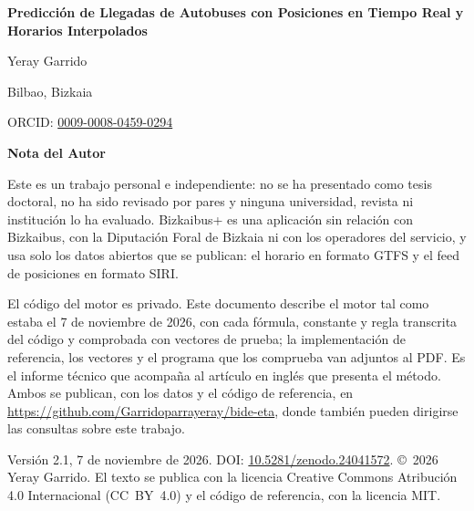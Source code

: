 \documentclass[12pt,letterpaper,oneside,openany]{book}
\theoremstyle{definition}
\renewcommand{\_}{\guionbajo\penalty50\hspace{0pt}}
\begin{document}

\thispagestyle{apa}
\begingroup
  \centering
  \vspace*{3\baselineskip}
  {\bfseries Predicción de Llegadas de Autobuses con Posiciones en Tiempo Real y Horarios Interpolados\par}
  \vspace{\baselineskip}
  Yeray Garrido\par
  Bilbao, Bizkaia\par
  ORCID: \href{https://orcid.org/0009-0008-0459-0294}{0009-0008-0459-0294}\par
  \vfill
  {\bfseries Nota del Autor\par}
  \RaggedRight
  \setlength{\parindent}{1.27cm}
  Este es un trabajo personal e independiente: no se ha presentado como tesis doctoral, no ha sido revisado por
  pares y ninguna universidad, revista ni institución lo ha evaluado. Bizkaibus+ es una aplicación sin relación con
  Bizkaibus, con la Diputación Foral de Bizkaia ni con los operadores del servicio, y usa solo los datos abiertos que se
  publican: el horario en formato GTFS y el feed de posiciones en formato SIRI.\par
  El código del motor es privado. Este documento describe el motor tal como estaba el 7 de noviembre de 2026, con cada
  fórmula, constante y regla transcrita del código y comprobada con vectores de prueba; la implementación de
  referencia, los vectores y el programa que los comprueba van adjuntos al PDF. Es el informe técnico que acompaña al
  artículo en inglés que presenta el método. Ambos se publican, con los datos y el código de referencia, en
  \url{https://github.com/Garridoparrayeray/bide-eta}, donde también pueden dirigirse las consultas sobre este trabajo.\par
  Versión 2.1, 7 de noviembre de 2026. DOI: \href{https://doi.org/10.5281/zenodo.24041572}{10.5281/zenodo.24041572}.
  \copyright~2026 Yeray Garrido. El texto se publica con la licencia Creative
  Commons Atribución 4.0 Internacional (CC~BY~4.0) y el código de referencia, con la licencia MIT.\par
\endgroup
\clearpage


\end{document}
